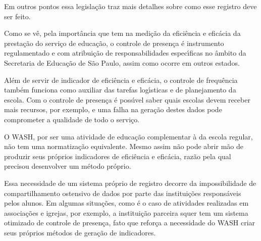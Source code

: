 \documentclass[
12pt,		%
openright,	%
twoside,  %
a4paper,			%
chapter=TITLE,		%
english,			%
french,				%
spanish,			%
brazil				%
]{USPSC-classe/USPSC_RedarTex}
\begin{document}
\noindent\begin{center}\mbox{\centering{}}\end{center}


Em outros pontos essa legisla\c{c}\~ao traz mais detalhes sobre como esse registro deve ser feito.










Como se v\^e, pela import\^ancia que tem na medi\c{c}\~ao da efici\^encia e efic\'acia da presta\c{c}\~ao do servi\c{c}o de educa\c{c}\~ao, o controle de presen\c{c}a \'e instrumento regulamentado e com atribui\c{c}\~ao de responsabilidades espec\'{\i}ficas no \^ambito da Secretaria de Educa\c{c}\~ao de S\~ao Paulo, assim como ocorre em outros estados.










Al\'em de servir de indicador de efici\^encia e efic\'acia, o controle de frequ\^encia tamb\'em funciona como auxiliar das tarefas log\'{\i}sticas e de planejamento da escola. Com o controle de presen\c{c}a \'e poss\'{\i}vel saber quais escolas devem receber mais recursos, por exemplo, e uma falha na gera\c{c}\~ao destes dados pode comprometer a qualidade de todo o servi\c{c}o.










O WASH, por ser uma atividade de educa\c{c}\~ao complementar \`a da escola regular, n\~ao tem uma normatiza\c{c}\~ao equivalente. Mesmo assim n\~ao pode abrir m\~ao de produzir seus pr\'oprios indicadores de efici\^encia e efic\'acia, raz\~ao pela qual  precisou desenvolver um m\'etodo pr\'oprio.










Essa necessidade de um sistema pr\'oprio de registro decorre da impossibilidade de compartilhamento ostensivo de dados por parte das institui\c{c}\~oes respons\'aveis pelos alunos. Em algumas situa\c{c}\~oes, como \'e o caso de atividades realizadas em associa\c{c}\~oes e igrejas, por exemplo, a institui\c{c}\~ao parceira squer tem um sistema otimizado de controle de presen\c{c}a, fato que refor\c{c}a a necessidade do WASH criar seus pr\'oprios m\'etodos de gera\c{c}\~ao de indicadores.
\end{document}

